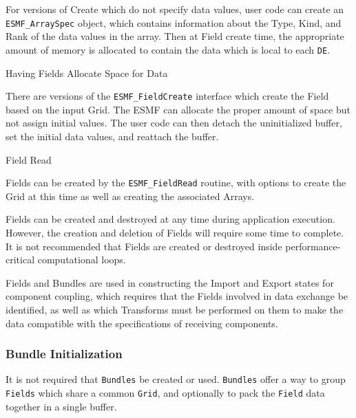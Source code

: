\begin{description}
For versions of Create which do not specify data values,
user code can create an {\tt ESMF\_ArraySpec} object, which
contains information about the Type, Kind, and Rank of the
data values in the array.  Then at Field create time, the
appropriate amount of memory is allocated to contain the
data which is local to each {\tt DE}.

\item{Having Fields Allocate Space for Data}

There are versions of the {\tt ESMF\_FieldCreate} interface
which create the Field based on the input Grid.  The ESMF
can allocate the proper amount of 
space but not assign initial values.  The user code
can then detach the uninitialized buffer, set the
initial data values, and reattach the buffer.

\item{Field Read}

Fields can be created by the {\tt ESMF\_FieldRead}
routine, with options to create the Grid at this time
as well as creating the associated Arrays.

\end{description}

Fields can be created and destroyed
at any time during application execution.  However, the creation
and deletion of Fields will require some time to complete.  
It is not recommended
that Fields are created or destroyed
inside performance-critical computational loops.

Fields and Bundles are used in constructing 
the Import and Export states for component coupling, 
which requires that the 
Fields involved in data exchange be identified, as well as
which Transforms must be performed on them to make the
data compatible with the specifications of
receiving components.  

\subsubsection{Bundle Initialization}

It is not required that {\tt Bundles} be created or used.
{\tt Bundles} offer a way to group {\tt Fields} which share a
common {\tt Grid}, and optionally to pack the {\tt Field} data
together in a single buffer.

